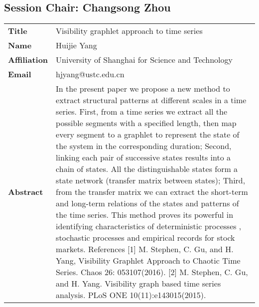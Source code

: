 \documentclass[oneside,A4paper,12pt]{article}
\begin{document}
\subsection*{Session \uppercase\expandafter{}  \hspace{10mm} Chair: Changsong Zhou}
\label{sec:orgbb15f56}
\begin{longtable}{p{2cm}p{14cm}}
\toprule
\textbf{Title} & Visibility graphlet approach to time series\\
\textbf{Name} & Huijie Yang\\
\textbf{Affiliation} & University of Shanghai for Science and Technology\\
\textbf{Email} & hjyang@ustc.edu.cn\\
\textbf{Abstract} & In the present paper we propose a new method to extract structural patterns at different scales in a time series. First, from a time series we extract all the possible segments with a specified length, then map every segment to a graphlet to represent the state of the system in the corresponding duration; Second, linking each pair of successive states results into a chain of states. All the distinguishable states form a state network (transfer matrix between states); Third, from the transfer matrix we can extract the short-term and long-term relations of the states and patterns of the time series. This method proves its powerful in identifying characteristics of deterministic processes , stochastic processes and empirical records for stock markets. References [1] M. Stephen, C. Gu, and H. Yang, Visibility Graphlet Approach to Chaotic Time Series. Chaos 26: 053107(2016). [2] M. Stephen, C. Gu, and H. Yang. Visibility graph based time series analysis. PLoS ONE 10(11):e143015(2015).\\
\bottomrule
\end{longtable}
\end{document}
